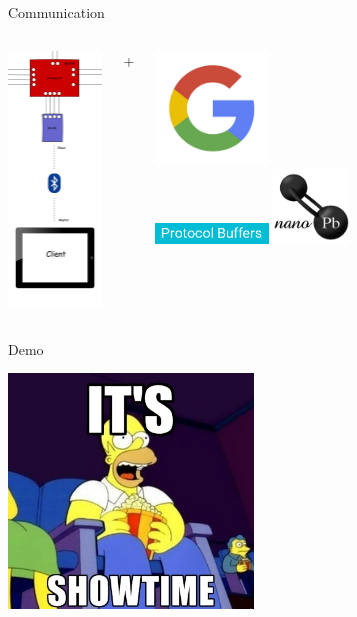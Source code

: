 \documentclass{beamer}
\begin{document}
	\begin{frame}{Communication}
		\begin{columns}
				\begin{center}
					\includegraphics[width=2.5cm]{pic/communication.png}
				\end{center}
				{\Huge{+}}
				\begin{center}
					\includegraphics[width=3cm]{pic/google.jpg}\\
					\includegraphics[width=3cm]{pic/protobuf.png}
					\vspace{0.7cm}
					\includegraphics[width=2cm]{pic/nanopb.png}
				\end{center}
		\end{columns}
	\end{frame}
	
	\begin{frame}{Demo}
		\begin{center}
			\includegraphics[width=6.5cm]{pic/showtime.jpg}
		\end{center}
	\end{frame}
\end{document}
